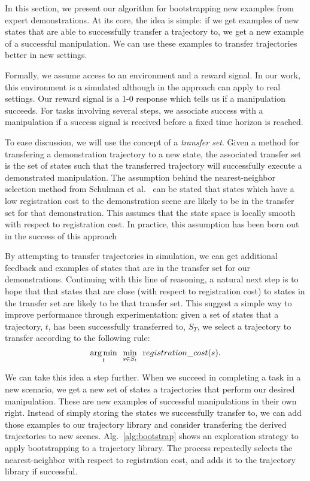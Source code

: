 In this section, we present our algorithm for bootstrapping new examples 
from expert demonstrations. At its core, the idea is simple: if we get
examples of new states that are able to successfully transfer a trajectory to,
we get a new example of a successful manipulation. We can use these examples
to transfer trajectories better in new settings.

Formally, we assume access to an environment and a reward signal. In our work, this
environment is a simulated although in the approach can apply to real settings. 
Our reward signal is a 1-0 response which tells us if a manipulation succeeds. For 
tasks involving several steps, we associate success with a manipulation if a success
signal is received before a fixed time horizon is reached.

To ease discussion, we will use the concept of a \emph{transfer set}. Given a method for
transfering a demonstration trajectory to a new state, the associated transfer set is
the set of states such that the transferred trajectory will successfully execute a
demonstrated manipulation. The assumption behind the nearest-neighbor selection
method from Schulman et al.~\cite{Schulmanetal_ISRR2013} can be stated that states
which have a low registration cost to the demonstration scene are likely to be in the
transfer set for that demonstration. This assumes that the state space is locally
smooth with respect to registration cost. In practice, this assumption has been
born out in the success of this approach


By attempting to transfer trajectories in simulation, we can get additional feedback
and examples of states that are in the transfer set for our demonstrations.
Continuing with this line of reasoning, a natural next step is to hope that that
states that are close (with respect to registration cost) to states in the transfer
set are likely to be that transfer set. This suggest a simple way to improve performance
through experimentation: given a set of
states that a trajectory, $t$,  has been successfully transferred to, $S_T$,
we select a trajectory to transfer according to the following rule:
\begin{equation}
\underset{t}{\operatorname*{arg\,min}} \ \ \underset{s\in S_t}{\min} \ \ {\text registration\_cost}(s).
\end{equation}

We can take this idea a step further. When we succeed in completing a task in a new
scenario, we get a new set of states a trajectories that perform our desired manipulation.
These are new examples of successful manipulations in their own right. Instead of simply storing
the states we successfully transfer to, we can add those examples to our trajectory 
library and consider transfering the derived trajectories to new scenes. Alg.~\ref{alg:bootstrap} shows an exploration strategy to apply bootstrapping to a trajectory library. The process
repeatedly selects the nearest-neighbor with respect to registration cost, and adds it 
to the trajectory library if successful.


